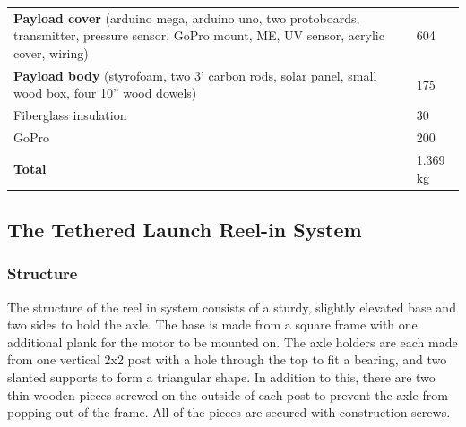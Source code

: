 \documentclass[12pt,]{article}
\begin{document}
\begin{longtable}[]{@{}ll@{}}
\begin{minipage}[t]{0.72\columnwidth}
\textbf{Payload cover} (arduino mega, arduino uno, two protoboards,
transmitter, pressure sensor, GoPro mount, ME, UV sensor, acrylic cover,
wiring)\strut
\end{minipage} & \begin{minipage}[t]{0.22\columnwidth}\raggedright\strut
604\strut
\end{minipage}\tabularnewline
\begin{minipage}[t]{0.72\columnwidth}\raggedright\strut
\textbf{Payload body} (styrofoam, two 3' carbon rods, solar panel, small
wood box, four 10'' wood dowels)\strut
\end{minipage} & \begin{minipage}[t]{0.22\columnwidth}\raggedright\strut
175\strut
\end{minipage}\tabularnewline
\begin{minipage}[t]{0.72\columnwidth}\raggedright\strut
Fiberglass insulation\strut
\end{minipage} & \begin{minipage}[t]{0.22\columnwidth}\raggedright\strut
30\strut
\end{minipage}\tabularnewline
\begin{minipage}[t]{0.72\columnwidth}\raggedright\strut
GoPro\strut
\end{minipage} & \begin{minipage}[t]{0.22\columnwidth}\raggedright\strut
200\strut
\end{minipage}\tabularnewline
\begin{minipage}[t]{0.72\columnwidth}\raggedright\strut
\textbf{Total}\strut
\end{minipage} & \begin{minipage}[t]{0.22\columnwidth}\raggedright\strut
1.369 kg\strut
\end{minipage}\tabularnewline
\bottomrule
\end{longtable}

\subsection{The Tethered Launch Reel-in
System}\label{the-tethered-launch-reel-in-system}

\subsubsection{Structure}\label{structure-1}

The structure of the reel in system consists of a sturdy, slightly
elevated base and two sides to hold the axle. The base is made from a
square frame with one additional plank for the motor to be mounted on.
The axle holders are each made from one vertical 2x2 post with a hole
through the top to fit a bearing, and two slanted supports to form a
triangular shape. In addition to this, there are two thin wooden pieces
screwed on the outside of each post to prevent the axle from popping out
of the frame. All of the pieces are secured with construction screws.
\end{document}

